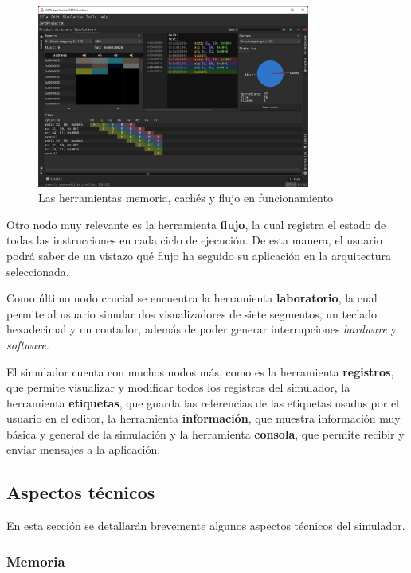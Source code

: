 \begin{figure}[h]
    \centering
    \includegraphics[width=0.8\textwidth]{images/tools/jams-memory-cache-flow}
    \caption{Las herramientas memoria, cachés y flujo en funcionamiento}
    \label{fig:jams-memory-cache-flow}
\end{figure}

Otro nodo muy relevante es la herramienta \textbf{flujo},
la cual registra el estado de todas las instrucciones en cada ciclo
de ejecución.
De esta manera, el usuario podrá saber de un vistazo qué flujo
ha seguido su aplicación en la arquitectura seleccionada.

Como último nodo crucial se encuentra la herramienta
\textbf{laboratorio}, la cual permite al usuario simular
dos visualizadores de siete segmentos, un teclado hexadecimal
y un contador, además de poder generar interrupciones \textit{hardware}
y \textit{software}.

El simulador cuenta con muchos nodos más, como es la
herramienta \textbf{registros}, que permite visualizar y modificar
todos los registros del simulador, la herramienta \textbf{etiquetas},
que guarda las referencias de las etiquetas usadas por el usuario
en el editor, la herramienta \textbf{información}, que muestra
información muy básica y general de la simulación y la
herramienta \textbf{consola}, que permite recibir y enviar
mensajes a la aplicación.

\subsection{Aspectos técnicos}\label{subsec:aspectos-tecnicos}

En esta sección se detallarán brevemente algunos aspectos técnicos
del simulador.

\subsubsection{Memoria}\label{subsubsec:memoria}

